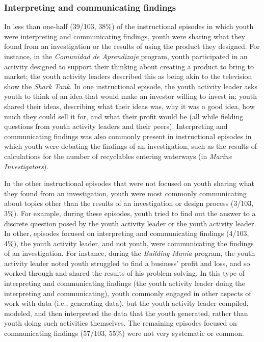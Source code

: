 \documentclass[]{msu-thesis}
\theoremstyle{definition}
\theoremstyle{definition}
\theoremstyle{definition}
\theoremstyle{remark}
\begin{document}
\subsubsection{Interpreting and communicating
findings}\label{interpreting-and-communicating-findings}

In less than one-half (39/103, 38\%) of the instructional episodes in
which youth were interpreting and communicating findings, youth were
sharing what they found from an investigation or the results of using
the product they designed. For instance, in the \emph{Comunidad de
Aprendizaje} program, youth participated in an activity designed to
support their thinking about creating a product to bring to market; the
youth activity leaders described this as being akin to the television
show the \emph{Shark Tank}. In one instructional episode, the youth
activity leader asks youth to think of an idea that would make an
investor willing to invest in; youth shared their ideas, describing what
their ideas was, why it was a good idea, how much they could sell it
for, and what their profit would be (all while fielding questions from
youth activity leaders and their peers). Interpreting and communicating
findings was also commonly present in instructional episodes in which
youth were debating the findings of an investigation, such as the
results of calculations for the number of recyclables entering waterways
(in \emph{Marine Investigators}).

In the other instructional episodes that were not focused on youth
sharing what they found from an investigation, youth were most commonly
communicating about topics other than the results of an investigation or
design process (3/103, 3\%). For example, during these episodes, youth
tried to find out the answer to a discrete question posed by the youth
activity leader or the youth activity leader. In other, episodes focused
on interpreting and communicating findings (4/103, 4\%), the youth
activity leader, and not youth, were communicating the findings of an
investigation. For instance, during the \emph{Building Mania} program,
the youth activity leader noted youth struggled to find a business'
profit and loss, and so worked through and shared the results of his
problem-solving. In this type of interpreting and communicating findings
(the youth activity leader doing the interpreting and communicating),
youth commonly engaged in other aspects of work with data (i.e.,
generating data), but the youth activity leader compiled, modeled, and
then interpreted the data that the youth generated, rather than youth
doing such activities themselves. The remaining episodes focused on
communicating findings (57/103, 55\%) were not very systematic or
common.
\end{document}
